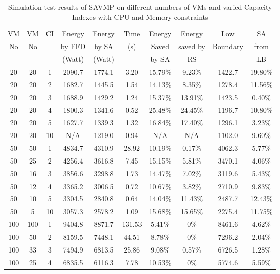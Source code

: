 \documentclass[10pt, conference, compsocconf]{IEEEtran}
\begin{document}

\begin{table*}[t]
\begin{center}
\begin{threeparttable}

\caption{Simulation test results of SAVMP on different numbers of VMs and varied
Capacity Indexes with CPU and Memory constraints}
\begin{tabular}{c|c|c|c|c|c|c|c|c|c}
 VM  & VM  & CI & Energy  & Energy&Time& Energy &Energy & Low & SA\\
No     &No &   &  by FFD & by SA & (s) &Saved &  saved by & Boundary &
from\\
  & & & (Watt) & (Watt) & & by SA &RS & & LB\\
\hline 
20 &20 & 1 & 2090.7 & 1774.1 & 3.20 & 15.79\% & 9.23\% & 1422.7 & 19.80\%\\
20 &20 & 2 & 1682.7 & 1445.5 & 1.54 & 14.13\% & 8.35\% & 1278.4 & 11.56\%\\
20 &20 & 3 & 1688.9 & 1429.2 & 1.24 & 15.37\% & 13.91\% & 1423.5 & 0.40\%\\
20 &20 & 4 & 1800.3 & 1341.6 & 0.52 & 25.48\% & 24.45\% & 1196.7 & 10.80\%\\
20 &20 & 5 & 1627.7 & 1339.3 & 1.32 & 16.84\% & 17.40\% & 1296.1 & 3.23\%\\
20 &20 & 10 & N/A\tnote{a} & 1219.0 & 0.94 & N/A\tnote{a} & N/A\tnote{a} &
1102.0 & 9.60\%\\
\hline
50 &50 & 1 & 4834.7 & 4310.9 & 28.92 & 10.19\% & 0.17\% & 4062.3 & 5.77\%\\
50 &25 & 2 & 4256.4 & 3616.8 & 7.45 & 15.15\% & 5.81\% & 3470.1 & 4.06\%\\
50 &16 & 3 & 3856.6 & 3298.8 & 1.73 & 14.47\% & 7.02\% & 3119.6 & 5.43\%\\
50 &12 & 4 & 3365.2 & 3006.5 & 0.72 & 10.67\% & 3.82\% & 2710.9 & 9.83\%\\
50 &10 & 5 & 3304.5 & 2840.8 & 0.64 & 14.04\% & 11.43\% & 2487.7 & 12.43\%\\
50 &5 & 10 & 3057.3 & 2578.2 & 1.09 & 15.68\% & 15.65\% & 2275.4 & 11.75\%\\
\hline
100 &100 & 1 & 9404.8 & 8871.7 & 131.53 & 5.41\% & 0\% & 8461.6 & 4.62\%\\
100 &50 & 2 & 8159.5 & 7448.1 & 44.51 & 8.78\% & 0\% & 7296.2 & 2.04\%\\
100 &33 & 3 & 7494.9 & 6813.5 & 25.86 & 9.08\% & 0.57\% & 6726.5 & 1.28\%\\
100 &25 & 4 & 6835.5 & 6116.3 & 7.78 & 10.53\% & 0\% & 5774.6 & 5.59\%\\

\end{tabular}
\end{threeparttable}
\end{center}
\end{table*}
\end{document}
